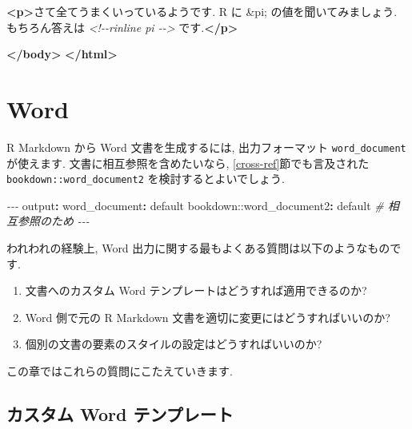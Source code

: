 \documentclass[
  11pt,
]{bxjsreport}
\newenvironment{Shaded}{\begin{snugshade}}{\end{snugshade}}
\newcommand{\AttributeTok}[1]{\textcolor[rgb]{0.77,0.63,0.00}{#1}}
\newcommand{\CommentTok}[1]{\textcolor[rgb]{0.56,0.35,0.01}{\textit{#1}}}
\newcommand{\DecValTok}[1]{\textcolor[rgb]{0.00,0.00,0.81}{#1}}
\newcommand{\FunctionTok}[1]{\textcolor[rgb]{0.00,0.00,0.00}{#1}}
\newcommand{\KeywordTok}[1]{\textcolor[rgb]{0.13,0.29,0.53}{\textbf{#1}}}
\newcommand{\NormalTok}[1]{#1}
\newcommand{\PreprocessorTok}[1]{\textcolor[rgb]{0.56,0.35,0.01}{\textit{#1}}}
\begin{document}
\begin{Shaded}
\begin{Highlighting}[]
  \KeywordTok{\textless{}p\textgreater{}}\NormalTok{さて全てうまくいっているようです. R に }\DecValTok{\&pi;}\NormalTok{ の値を聞いてみましょう. もちろん答えは }\CommentTok{\textless{}!{-}{-}rinline pi {-}{-}\textgreater{}}\NormalTok{ です.}\KeywordTok{\textless{}/p\textgreater{}}

\KeywordTok{\textless{}/body\textgreater{}}
\KeywordTok{\textless{}/html\textgreater{}}
\end{Highlighting}
\end{Shaded}

\hypertarget{word}{%
\chapter{Word}\label{word}}

R Markdown から Word 文書を生成するには, 出力フォーマット \texttt{word\_document} が使えます. 文書に相互参照を含めたいなら, \ref{cross-ref}節でも言及された \texttt{bookdown::word\_document2} を検討するとよいでしょう.

\begin{Shaded}
\begin{Highlighting}[]
\PreprocessorTok{{-}{-}{-}}
\FunctionTok{output}\KeywordTok{:}
\AttributeTok{  }\FunctionTok{word\_document}\KeywordTok{:}\AttributeTok{ default}
\AttributeTok{  bookdown::word\_document2}\KeywordTok{:}\FunctionTok{}\AttributeTok{ default}\CommentTok{  \# 相互参照のため}
\PreprocessorTok{{-}{-}{-}}
\end{Highlighting}
\end{Shaded}

われわれの経験上, Word 出力に関する最もよくある質問は以下のようなものです.

\begin{enumerate}
\def\labelenumi{\arabic{enumi}.}
\item
  文書へのカスタム Word テンプレートはどうすれば適用できるのか?
\item
  Word 側で元の R Markdown 文書を適切に変更にはどうすればいいのか?
\item
  個別の文書の要素のスタイルの設定はどうすればいいのか?
\end{enumerate}

この章ではこれらの質問にこたえていきます.

\hypertarget{word-template}{%
\section{カスタム Word テンプレート}\label{word-template}}
\end{document}
